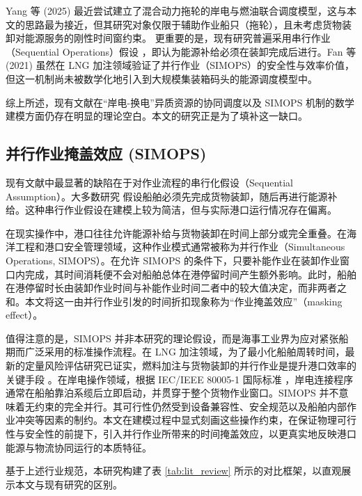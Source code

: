 \documentclass[UTF8, a4paper, 12pt]{ctexart}
\begin{document}
Yang 等 (2025) \cite{Yang2025_Hybrid} 最近尝试建立了混合动力拖轮的岸电与燃油联合调度模型，这与本文的思路最为接近，但其研究对象仅限于辅助作业船只（拖轮），且未考虑货物装卸对能源服务的刚性时间窗约束。
更重要的是，现有研究普遍采用串行作业（Sequential Operations）假设 \cite{Agatz2018}，即认为能源补给必须在装卸完成后进行。Fan 等 (2021) \cite{Fan2021} 虽然在 LNG 加注领域验证了并行作业（SIMOPS）的安全性与效率价值，但这一机制尚未被数学化地引入到大规模集装箱码头的能源调度模型中。

综上所述，现有文献在“岸电-换电”异质资源的协同调度以及 SIMOPS 机制的数学建模方面仍存在明显的理论空白。本文的研究正是为了填补这一缺口。

\subsection{并行作业掩盖效应 (SIMOPS)}
现有文献中最显著的缺陷在于对作业流程的串行化假设（Sequential Assumption）。大多数研究 \cite{Agatz2018, Moshref2020} 假设船舶必须先完成货物装卸，随后再进行能源补给。这种串行作业假设在建模上较为简洁，但与实际港口运行情况存在偏离。

在现实操作中，港口往往允许能源补给与货物装卸在时间上部分或完全重叠。在海洋工程和港口安全管理领域，这种作业模式通常被称为并行作业（Simultaneous Operations, SIMOPS）。在允许 SIMOPS 的条件下，只要补能作业在装卸作业窗口内完成，其时间消耗便不会对船舶总体在港停留时间产生额外影响。此时，船舶在港停留时长由装卸作业时间与补能作业时间二者中的较大值决定，而非两者之和。本文将这一由并行作业引发的时间折扣现象称为“作业掩盖效应”（masking effect）。

值得注意的是，SIMOPS 并非本研究的理论假设，而是海事工业界为应对紧张船期而广泛采用的标准操作流程。在 LNG 加注领域，为了最小化船舶周转时间，最新的定量风险评估研究已证实，燃料加注与货物装卸的并行作业是提升港口效率的关键手段 \cite{Fan2021}。在岸电操作领域，根据 IEC/IEEE 80005-1 国际标准 \cite{IEC80005}，岸电连接程序通常在船舶靠泊系缆后立即启动，并贯穿于整个货物作业窗口。SIMOPS 并不意味着无约束的完全并行。其可行性仍然受到设备兼容性、安全规范以及船舶内部作业冲突等因素的制约。本文在建模过程中显式刻画这些操作约束，在保证物理可行性与安全性的前提下，引入并行作业所带来的时间掩盖效应，以更真实地反映港口能源与物流协同运行的本质特征。


基于上述行业规范，本研究构建了表 \ref{tab:lit_review} 所示的对比框架，以直观展示本文与现有研究的区别。
\end{document}
